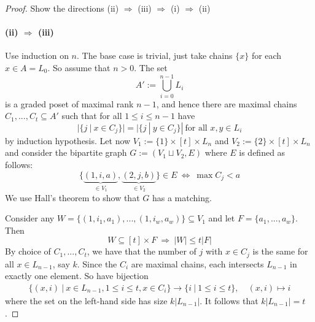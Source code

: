 \documentclass{scrartcl}
\theoremstyle{definition}
\begin{document}
\begin{proof}
    Show the directions (ii) $\Rightarrow$ (iii) $\Rightarrow$ (i) $\Rightarrow$ (ii)
    \paragraph{(ii) $\Rightarrow$ (iii)} Use induction on $n$.
    The base case is trivial, just take chains $\{x\}$ for each $x \in A = L_0$.
    So assume that $n > 0$. The set
    \begin{equation*}
        A' := \bigcup_{i = 0}^{n - 1} L_i
    \end{equation*}
    is a graded poset of maximal rank $n - 1$, and hence there are maximal chains $C_1, ..., C_t \subseteq A'$ such that for all $1 \leq i \leq n - 1$ have
    \begin{equation*}
        |\{j \ | \ x \in C_j\}| = |\{j \ | \ y \in C_j\}| \ \text{for all $x, y \in L_i$}
    \end{equation*}
    by induction hypothesis.
    Let now $V_1 := \{1\} \times [t] \times L_n$ and $V_2 := \{2\} \times [t] \times L_n$ and consider the bipartite graph $G := (V_1 \sqcup V_2, E)$ where $E$ is defined as follows:
    \begin{equation*}
        \{ \underbrace{(1, i, a)}_{\in V_1}, \underbrace{(2, j, b)}_{\in V_2} \} \in E \ \Leftrightarrow \ \max C_j < a
    \end{equation*}
    We use Hall's theorem to show that $G$ has a matching.

    Consider any $W = \{ (1, i_1, a_1), ..., (1, i_w, a_w) \} \subseteq V_1$ and let $F = \{ a_1, ..., a_w \}$.
    Then
    \begin{equation*}
        W \subseteq [t] \times F \ \Rightarrow \ |W| \leq t|F|
    \end{equation*}
    By choice of $C_1, ..., C_t$, we have that the number of $j$ with $x \in C_j$ is the same for all $x \in L_{n - 1}$, say $k$.
    Since the $C_i$ are maximal chains, each intersects $L_{n - 1}$ in exactly one element.
    So have bijection
    \begin{align*}
        \{ (x, i) \ | \ x \in L_{n - 1}, 1 \leq i \leq t, x \in C_i\} \to \{ i \ | \ 1 \leq i \leq t \}, \quad (x, i) \mapsto i
    \end{align*}
    where the set on the left-hand side has size $k |L_{n - 1}|$. It follows that $k|L_{n - 1}| = t$.


\end{proof}
\end{document}

